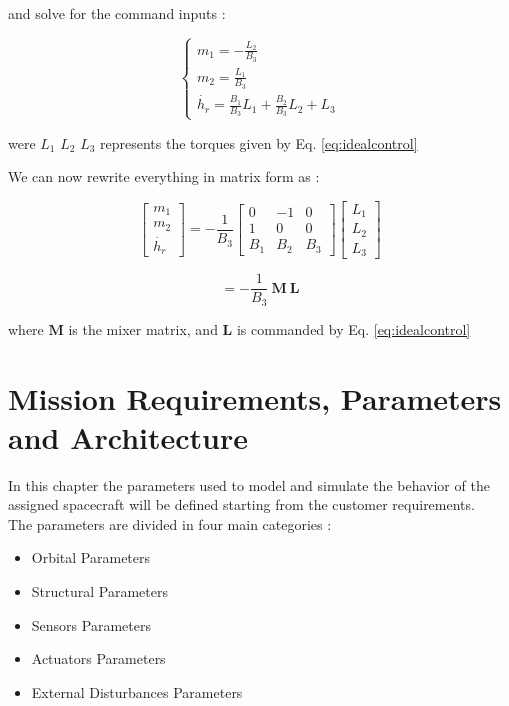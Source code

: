 \documentclass[11pt,a4paper]{report}
\begin{document}
and solve for the command inputs : 

\begin{equation}
 \begin{cases} m_{1}=-\frac{L_2}{B_3}\\ m_2 = \frac{L_1}{B_3} \\ \dot{h_{r}} = \frac{B_1}{B_3}L_1 + \frac{B_2}{B_3} L_2 + L_3 \end{cases}
\end{equation}

were $L_1$ $L_2$ $L_3$ represents the torques given by Eq. \ref{eq:idealcontrol}

We can now rewrite everything in matrix form as : 

\begin{equation}
 \begin{bmatrix}
    m_1\\
    m_2\\
    \dot{h_{r}}
 \end{bmatrix}
= - \frac{1}{B_3}
 \begin{bmatrix}
    0 & -1 & 0 \\
    1 & 0 & 0 \\
    B_{1} & B_{2} & B_{3}
 \end{bmatrix} 
 \begin{bmatrix}
    L_{1}\\
    L_{2}\\
    L_{3}
 \end{bmatrix}  
\end{equation}

\begin{equation}
 [\mathbf{m_{1:2}} \ \mathbf{\dot{h_{r}}}] = -\frac{1}{B_3} \ \mathbf{M} \ \mathbf{L}
\end{equation}

where $\mathbf{M}$ is the mixer matrix, and $\mathbf{L}$ is commanded by Eq. \ref{eq:idealcontrol}

\chapter{Mission Requirements, Parameters and Architecture }
In this chapter the parameters used to model and simulate the behavior of the assigned spacecraft will be defined starting from the customer requirements.\\
The parameters are divided in four main categories : 

\begin{itemize}
 \item Orbital Parameters
 \item Structural Parameters
 \item Sensors Parameters
 \item Actuators Parameters
 \item External Disturbances Parameters
\end{itemize}
\end{document}
